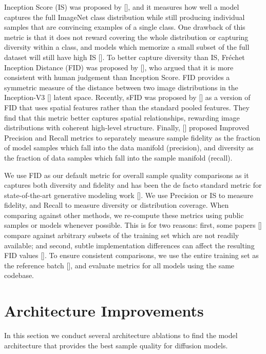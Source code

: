 Inception Score (IS) was proposed by \citeauthor{inceptionscore} [], and it measures how well a model captures the full ImageNet class distribution while still producing individual samples that are convincing examples of a single class. One drawback of this metric is that it does not reward covering the whole distribution or capturing diversity within a class, and models which memorize a small subset of the full dataset will still have high IS []. To better capture diversity than IS, Fréchet Inception Distance (FID) was proposed by \citeauthor{fid} [], who argued that it is more consistent with human judgement than Inception Score. FID provides a symmetric measure of the distance between two image distributions in the Inception-V3 [] latent space. Recently, sFID was proposed by \citeauthor{dctransformer} [] as a version of FID that uses spatial features rather than the standard pooled features. They find that this metric better captures spatial relationships, rewarding image distributions with coherent high-level structure. Finally, \citeauthor{precrecall} [] proposed Improved Precision and Recall metrics to separately measure sample fidelity as the fraction of model samples which fall into the data manifold (precision), and diversity as the fraction of data samples which fall into the sample manifold (recall).

We use FID as our default metric for overall sample quality comparisons as it captures both diversity and fidelity and has been the de facto standard metric for state-of-the-art generative modeling work []. We use Precision or IS to measure fidelity, and Recall to measure diversity or distribution coverage. When comparing against other methods, we re-compute these metrics using public samples or models whenever possible. This is for two reasons: first, some papers [] compare against arbitrary subsets of the training set which are not readily available; and second, subtle implementation differences can affect the resulting FID values []. To ensure consistent comparisons, we use the entire training set as the reference batch [], and evaluate metrics for all models using the same codebase.

\section{Architecture Improvements}
\label{sec:archablation}
In this section we conduct several architecture ablations to find the model architecture that provides the best sample quality for diffusion models.

